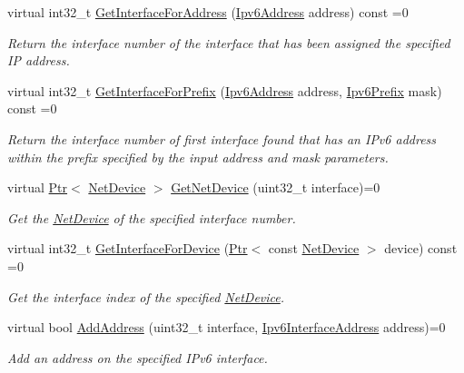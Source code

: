 \begin{DoxyCompactItemize}
virtual int32\+\_\+t \hyperlink{classns3_1_1Ipv6_aa8003b6741a18e196d7cb8369e2ef80f}{Get\+Interface\+For\+Address} (\hyperlink{classns3_1_1Ipv6Address}{Ipv6\+Address} address) const =0
\begin{DoxyCompactList}\small\item\em Return the interface number of the interface that has been assigned the specified IP address. \end{DoxyCompactList}\item 
virtual int32\+\_\+t \hyperlink{classns3_1_1Ipv6_a5f3369dd6c6b2e40aae5af0eed096f48}{Get\+Interface\+For\+Prefix} (\hyperlink{classns3_1_1Ipv6Address}{Ipv6\+Address} address, \hyperlink{classns3_1_1Ipv6Prefix}{Ipv6\+Prefix} mask) const =0
\begin{DoxyCompactList}\small\item\em Return the interface number of first interface found that has an I\+Pv6 address within the prefix specified by the input address and mask parameters. \end{DoxyCompactList}\item 
virtual \hyperlink{classns3_1_1Ptr}{Ptr}$<$ \hyperlink{classns3_1_1NetDevice}{Net\+Device} $>$ \hyperlink{classns3_1_1Ipv6_a6e7c9dea7730b4414e543241399faecf}{Get\+Net\+Device} (uint32\+\_\+t interface)=0
\begin{DoxyCompactList}\small\item\em Get the \hyperlink{classns3_1_1NetDevice}{Net\+Device} of the specified interface number. \end{DoxyCompactList}\item 
virtual int32\+\_\+t \hyperlink{classns3_1_1Ipv6_a3337dc6ce66612b0fa9b57f7f0338745}{Get\+Interface\+For\+Device} (\hyperlink{classns3_1_1Ptr}{Ptr}$<$ const \hyperlink{classns3_1_1NetDevice}{Net\+Device} $>$ device) const =0
\begin{DoxyCompactList}\small\item\em Get the interface index of the specified \hyperlink{classns3_1_1NetDevice}{Net\+Device}. \end{DoxyCompactList}\item 
virtual bool \hyperlink{classns3_1_1Ipv6_a5cd576e83cf65445be3a0b5ffd1ddc5c}{Add\+Address} (uint32\+\_\+t interface, \hyperlink{classns3_1_1Ipv6InterfaceAddress}{Ipv6\+Interface\+Address} address)=0
\begin{DoxyCompactList}\small\item\em Add an address on the specified I\+Pv6 interface. \end{DoxyCompactList}\item 

\end{DoxyCompactItemize}
